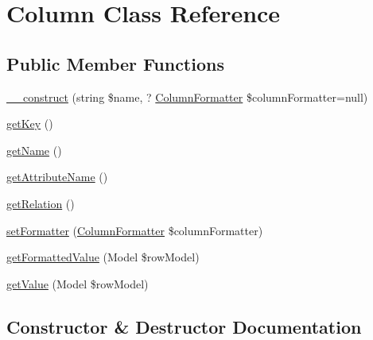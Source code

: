 \hypertarget{classhamburgscleanest_1_1_data_tables_1_1_models_1_1_column}{}\section{Column Class Reference}
\label{classhamburgscleanest_1_1_data_tables_1_1_models_1_1_column}
\subsection*{Public Member Functions}
\begin{DoxyCompactItemize}
\item 
\hyperlink{classhamburgscleanest_1_1_data_tables_1_1_models_1_1_column_a1164c670a9c8d4167848374c2ce101cc}{\+\_\+\+\_\+construct} (string \$name, ? \hyperlink{interfacehamburgscleanest_1_1_data_tables_1_1_interfaces_1_1_column_formatter}{Column\+Formatter} \$column\+Formatter=null)
\item 
\hyperlink{classhamburgscleanest_1_1_data_tables_1_1_models_1_1_column_ad40c766ec8aced9770fe6ae269a1e781}{get\+Key} ()
\item 
\hyperlink{classhamburgscleanest_1_1_data_tables_1_1_models_1_1_column_a3d0963e68bb313b163a73f2803c64600}{get\+Name} ()
\item 
\hyperlink{classhamburgscleanest_1_1_data_tables_1_1_models_1_1_column_aef428fd06c26df985591f168f4387ddf}{get\+Attribute\+Name} ()
\item 
\hyperlink{classhamburgscleanest_1_1_data_tables_1_1_models_1_1_column_ab4da3592f01f7673fec5163a047cc82e}{get\+Relation} ()
\item 
\hyperlink{classhamburgscleanest_1_1_data_tables_1_1_models_1_1_column_ab66956c2516c8994e6965e79e73bae56}{set\+Formatter} (\hyperlink{interfacehamburgscleanest_1_1_data_tables_1_1_interfaces_1_1_column_formatter}{Column\+Formatter} \$column\+Formatter)
\item 
\hyperlink{classhamburgscleanest_1_1_data_tables_1_1_models_1_1_column_a26f5178f9badcf426408b131cb925797}{get\+Formatted\+Value} (Model \$row\+Model)
\item 
\hyperlink{classhamburgscleanest_1_1_data_tables_1_1_models_1_1_column_ae1281be756bd4669920b08da359f3dd6}{get\+Value} (Model \$row\+Model)
\end{DoxyCompactItemize}


\subsection{Constructor \& Destructor Documentation}
\mbox{\label{classhamburgscleanest_1_1_data_tables_1_1_models_1_1_column_a1164c670a9c8d4167848374c2ce101cc}} 
